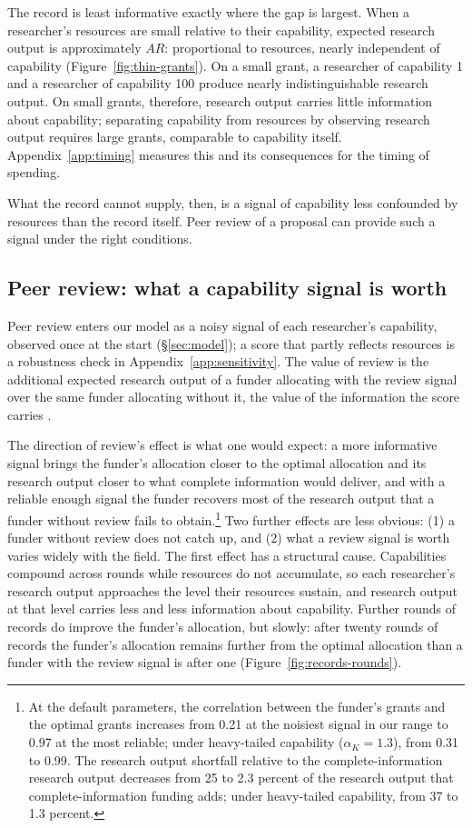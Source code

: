 \documentclass[article, 11pt, reqno]{amsart}
\theoremstyle{named}
\begin{document}
The record is least informative exactly where the gap is largest. When a researcher's resources are small relative to their capability, expected research output is approximately $AR$: proportional to resources, nearly independent of capability (Figure~\ref{fig:thin-grants}). On a small grant, a researcher of capability 1 and a researcher of capability 100 produce nearly indistinguishable research output. On small grants, therefore, research output carries little information about capability; separating capability from resources by observing research output requires large grants, comparable to capability itself. Appendix~\ref{app:timing} measures this and its consequences for the timing of spending.



What the record cannot supply, then, is a signal of capability less confounded by resources than the record itself. Peer review of a proposal can provide such a signal under the right conditions.

\subsection*{Peer review: what a capability signal is worth}

Peer review enters our model as a noisy signal of each researcher's capability, observed once at the start (\S\ref{sec:model}); a score that partly reflects resources is a robustness check in Appendix~\ref{app:sensitivity}. The value of review is the additional expected research output of a funder allocating with the review signal over the same funder allocating without it, the value of the information the score carries \citep{Howard1966}.

The direction of review's effect is what one would expect: a more informative signal brings the funder's allocation closer to the optimal allocation and its research output closer to what complete information would deliver, and with a reliable enough signal the funder recovers most of the research output that a funder without review fails to obtain.\footnote{At the default parameters, the correlation between the funder's grants and the optimal grants increases from 0.21 at the noisiest signal in our range to 0.97 at the most reliable; under heavy-tailed capability ($\alpha_K = 1.3$), from 0.31 to 0.99. The research output shortfall relative to the complete-information research output decreases from 25 to 2.3 percent of the research output that complete-information funding adds; under heavy-tailed capability, from 37 to 1.3 percent.} Two further effects are less obvious: (1) a funder without review does not catch up, and (2) what a review signal is worth varies widely with the field. The first effect has a structural cause. Capabilities compound across rounds while resources do not accumulate, so each researcher's research output approaches the level their resources sustain, and research output at that level carries less and less information about capability. Further rounds of records do improve the funder's allocation, but slowly: after twenty rounds of records the funder's allocation remains further from the optimal allocation than a funder with the review signal is after one (Figure~\ref{fig:records-rounds}).
\end{document}
